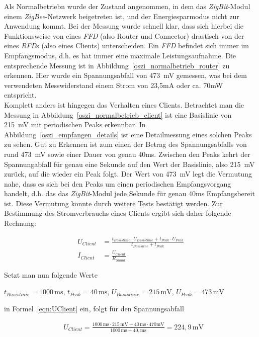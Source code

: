 Als Normalbetriebn wurde der Zustand angenommen, in dem das \emph{ZigBit}-Modul einem \emph{ZigBee}-Netzwerk beigetreten
ist, und der Energiesparmodus nicht zur Anwendung kommt. Bei der Messung wurde schnell klar, dass sich hierbei die
Funktionsweise von eines \emph{FFD} (also Router und Connector) drastisch von der eines \emph{RFD}s (also eines Clients) 
unterscheiden. Ein \emph{FFD} befindet sich immer im Empfangsmodus, d.h. es hat immer eine maximale Leistungsaufnahme. 
Die entsprechende Messung ist in Abbildung~\ref{oszi_normalbetrieb_router} zu erkennen. Hier wurde ein Spannungsabfall
von 473~mV gemessen, was bei dem verwendeten Messwiderstand einem Strom von 23,5mA oder ca. 70mW entspricht.\\
Komplett anders ist hingegen das Verhalten eines Clients. Betrachtet man die Messung in
Abbildung~\ref{oszi_normalbetrieb_client} ist eine Basislinie von 215~mV mit periodischen Peaks erkennbar. 
In Abbildung~\ref{oszi_empfangen_details} ist eine Detailmessung eines solchen Peaks zu sehen.  Gut zu Erkennen ist zum 
einen der Betrag des Spannungsabfalls von rund 473~mV sowie einer Dauer von genau 40ms. Zwischen den Peaks kehrt der 
Spannungabfall für genau eine Sekunde auf den Wert der Basislinie, also 215~mV zurück, auf die wieder ein Peak folgt.
Der Wert von 473~mV legt die Vermutung nahe, dass es sich bei den Peaks um einen periodischen Empfangsvorgang handelt,
d.h. das das \emph{ZigBit}-Modul jede Sekunde für genau 40ms Empfangsbereit ist. Diese Vermutung konnte durch weitere
Tests bestätigt werden. Zur Bestimmung des Stromverbrauchs eines Clients ergibt sich daher folgende Rechnung:

\begin{align}
    U_{Client} &= \frac{t_{Basislinie} \cdot U_{Basislinie} + t_{Peak} \cdot U_{Peak}}{t_{Basisline} + t_{Peak}}
   \label{eqn:UClient}\\
    I_{Client} &= \frac{U_{Client}}{R_{Shunt}}
    \label{eqn:IClient}
\end{align}

Setzt man nun folgende Werte 

\begin{center}
    $t_{Basislinie} = 1000\,\text{ms}$,\quad
    $t_{Peak}       = 40\,\text{ms}$,\quad
    $U_{Basislinie} = 215\,\text{mV}$,\quad
    $U_{Peak}       = 473\,\text{mV}$
\end{center}

in Formel~\ref{eqn:UClient} ein, folgt für den Spannungsabfall

\begin{align*}
    &U_{Client} = \frac{1000\,\text{ms} \cdot 215\,\text{mV} + 40\,\text{ms} \cdot 470\text{mV}}{1000\,\text{ms} + 40,\text{ms}} = 224,9\,\text{mV}
\end{align*}

